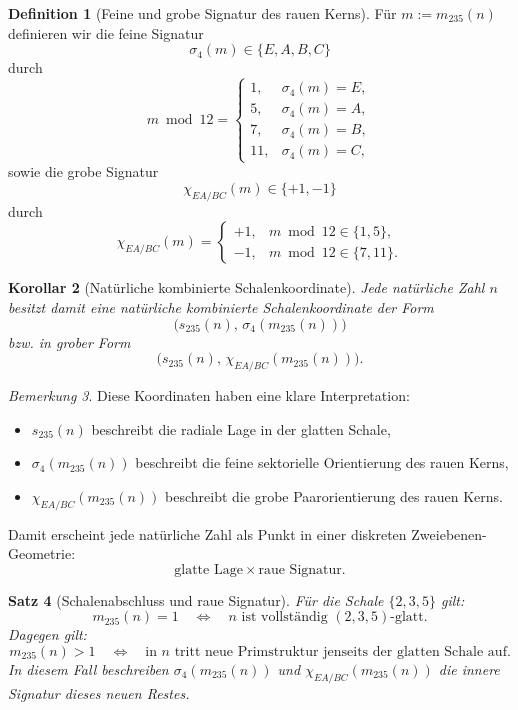\documentclass[11pt,a4paper]{article}
\newtheorem{satz}{Satz}
\newtheorem{korollar}[satz]{Korollar}
\theoremstyle{definition}
\newtheorem{definition}[satz]{Definition}
\theoremstyle{remark}
\newtheorem{bemerkung}[satz]{Bemerkung}
\begin{document}
	\begin{definition}[Feine und grobe Signatur des rauen Kerns]
		Für \(m:=m_{235}(n)\) definieren wir die feine Signatur
		\[
		\sigma_4(m)\in\{E,A,B,C\}
		\]
		durch
		\[
		m\bmod 12=
		\begin{cases}
			1,& \sigma_4(m)=E,\\
			5,& \sigma_4(m)=A,\\
			7,& \sigma_4(m)=B,\\
			11,& \sigma_4(m)=C,
		\end{cases}
		\]
		sowie die grobe Signatur
		\[
		\chi_{EA/BC}(m)\in\{+1,-1\}
		\]
		durch
		\[
		\chi_{EA/BC}(m)=
		\begin{cases}
			+1,& m\bmod 12\in\{1,5\},\\[1mm]
			-1,& m\bmod 12\in\{7,11\}.
		\end{cases}
		\]
	\end{definition}
	
	\begin{korollar}[Natürliche kombinierte Schalenkoordinate]
		\label{kor:kombinierte_koordinate}
		Jede natürliche Zahl \(n\) besitzt damit eine natürliche kombinierte Schalenkoordinate der
		Form
		\[
		\boxed{
			\bigl(s_{235}(n),\,\sigma_4(m_{235}(n))\bigr)
		}
		\]
		bzw. in grober Form
		\[
		\boxed{
			\bigl(s_{235}(n),\,\chi_{EA/BC}(m_{235}(n))\bigr).
		}
		\]
	\end{korollar}
	
	\begin{bemerkung}
		Diese Koordinaten haben eine klare Interpretation:
		
		\begin{itemize}
			\item \(s_{235}(n)\) beschreibt die radiale Lage in der glatten Schale,
			\item \(\sigma_4(m_{235}(n))\) beschreibt die feine sektorielle Orientierung des rauen
			Kerns,
			\item \(\chi_{EA/BC}(m_{235}(n))\) beschreibt die grobe Paarorientierung des rauen Kerns.
		\end{itemize}
		
		Damit erscheint jede natürliche Zahl als Punkt in einer diskreten Zweiebenen-Geometrie:
		\[
		\text{glatte Lage} \times \text{raue Signatur}.
		\]
	\end{bemerkung}
	
	\begin{satz}[Schalenabschluss und raue Signatur]
		\label{satz:glatt_rau_abschluss}
		Für die Schale \(\{2,3,5\}\) gilt:
		\[
		m_{235}(n)=1
		\quad\Longleftrightarrow\quad
		n \text{ ist vollständig }(2,3,5)\text{-glatt.}
		\]
		Dagegen gilt:
		\[
		m_{235}(n)>1
		\quad\Longleftrightarrow\quad
		\text{in }n\text{ tritt neue Primstruktur jenseits der glatten Schale auf.}
		\]
		In diesem Fall beschreiben \(\sigma_4(m_{235}(n))\) und \(\chi_{EA/BC}(m_{235}(n))\)
		die innere Signatur dieses neuen Restes.
	\end{satz}
	
\end{document}

